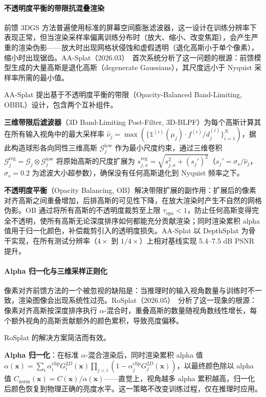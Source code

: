 \paragraph{不透明度平衡的带限抗混叠渲染}

前馈 3DGS 方法普遍使用标准的屏幕空间膨胀滤波器，这一设计在训练分辨率下表现正常，但当渲染采样率偏离训练分布时（放大、缩小、改变焦距），会产生严重的渲染伪影——放大时出现网格状侵蚀和虚假透明（退化高斯小于单个像素），缩小时出现锯齿。AA-Splat（2026.03）~\cite{2603_29394}首次系统分析了这一问题的根源：前馈模型生成的大量高斯是退化高斯（degenerate Gaussians），其尺度远小于 Nyquist 采样率所需的最小值。

AA-Splat 提出基于不透明度平衡的带限（Opacity-Balanced Band-Limiting, OBBL）设计，包含两个互补组件。

\textbf{三维带限后滤波器}（3D Band-Limiting Post-Filter, 3D-BLPF）为每个高斯计算其在所有输入视角中的最大采样率 $\hat{\nu}_j = \max(\{\mathds{1}^{(i)}(\mu_j) \cdot f^{(i)} / d_j^{(i)}\}_{i=1}^N)$，据此构造球形各向同性三维高斯 $\mathcal{G}_j^{\text{low}}$ 作为最小尺度约束，通过三维卷积 $\mathcal{G}_j^{\text{reg}} = \mathcal{G}_j \otimes \mathcal{G}_j^{\text{low}}$ 将原始高斯的尺度扩展为 $s_{j,x}^{\text{reg}} = \sqrt{s_{j,x}^2 + (s_j')^2}$（$s_j' = \sigma_s / \hat{\nu}_j$，$\sigma_s = 0.2$ 为滤波大小超参数），确保没有任何高斯退化到 Nyquist 频率之下。

\textbf{不透明度平衡}（Opacity Balancing, OB）解决带限扩展的副作用：扩展后的像素对齐高斯之间重叠增加，后排高斯的可见性下降，在放大渲染时产生不自然的网格伪影。OB 通过将所有高斯的不透明度裁剪至上限 $\tau_{\text{opa}} < 1$，防止任何高斯变得完全不透明，使所有高斯无论深度排序如何都能充分贡献渲染；同时渲染累积 alpha 值用于归一化颜色，补偿裁剪引入的透明度损失。AA-Splat 以 DepthSplat 为骨干实现，在所有测试分辨率（$4\times$ 到 $1/4\times$）上相对基线实现 5.4--7.5 dB PSNR 提升。

\paragraph{Alpha 归一化与三维采样正则化}

像素对齐前馈方法的一个被忽视的缺陷是：当推理时的输入视角数量与训练时不一致，渲染图像会出现系统性过亮。RoSplat（2026.05）~\cite{2605_13093}分析了这一现象的根源：像素对齐高斯按深度排序执行 $\alpha$-混合时，重叠高斯的数量随视角数线性增长，每个额外视角的高斯贡献额外的颜色累积，导致亮度偏移。

RoSplat 的解决方案简洁而有效。

\textbf{Alpha 归一化}：在标准 $\alpha$-混合渲染后，同时渲染累积 alpha 值 $\alpha(\mathbf{x}) = \sum_i \alpha_i^{\text{clip}} G_i^{2D}(\mathbf{x}) \prod_{j<i}(1 - \alpha_j^{\text{clip}} G_j^{2D}(\mathbf{x}))$，以最终颜色除以 alpha 值 $C_{\text{norm}}(\mathbf{x}) = C(\mathbf{x}) / \alpha(\mathbf{x})$——直觉上，视角越多 alpha 累积越高，归一化后颜色恢复到物理正确的亮度水平。这一策略不改变训练过程，仅在推理时应用。

